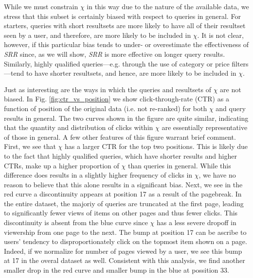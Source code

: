 \documentclass{article}
\begin{document}
While we must constrain $\chi$ in this way due to the nature of the available
data, we stress that this subset is certainly biased with respect to queries in
general. For starters, queries with short resultsets are more likely to have all
of their resultset seen by a user, and therefore, are more likely to be included
in $\chi$. It is not clear, however, if this particular bias tends to under- or
overestimate the effectiveness of {\em SRR} since, as we will show, {\em SRR} is
more effective on longer query results. Similarly, highly qualified
queries---e.g. through the use of category or price filters---tend to have
shorter resultsets, and hence, are more likely to be included in $\chi$.

Just as interesting are the ways in which the queries and resultsets of $\chi$
are not biased. In Fig. \ref{fig:ctr_vs_position} we show click-through-rate
(CTR) as a function of position of the original data (i.e. not re-ranked) for
both $\chi$ and query results in general. The two curves shown in the figure are
quite similar, indicating that the quantity and distribution of clicks within
$\chi$ are essentially representative of those in general. A few other features
of this figure warrant brief comment. First, we see that $\chi$ has a larger CTR
for the top two positions. This is likely due to the fact that highly qualified
queries, which have shorter results and higher CTRs,  make up a higher
proportion of $\chi$ than queries in general. While this difference does results
in a slightly higher frequency of clicks in $\chi$, we have no reason to believe
that this alone results in a significant bias. Next, we see in the red curve a
discontinuity appears at position 17 as a result of the pagebreak. In the entire
dataset, the majoriy of queries are truncated at the first page, leading to
significantly fewer views of items on other pages and thus fewer clicks. This
discontinuity is absent from the blue curve since $\chi$ has a less severe
dropoff in viewership from one page to the next.  The bump at position 17 can be
ascribe to users' tendency to disproportionately click on the topmost item shown
on a page. Indeed, if we normalize for number of pages viewed by a user, we see
this bump at 17 in the overal dataset as well. Consistent with this analysis, we
find another smaller drop in the red curve and smaller bump in the blue at
possition 33.
\end{document}
